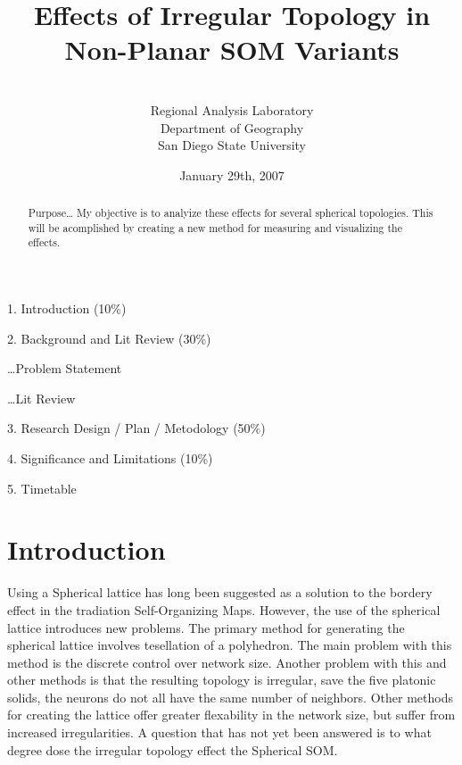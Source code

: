 \documentclass[12pt]{article}
\title{Effects of Irregular Topology in Non-Planar SOM Variants}
\author{\sc{Charles R. Schmidt}\\Regional Analysis Laboratory\\Department of Geography\\San Diego State University}
\date{January 29th, 2007}
\begin{document}
\maketitle
\begin{abstract}

Purpose\ldots
My objective is to analyize these effects for several spherical topologies.
This will be acomplished by creating a new method for measuring and visualizing
the effects.




\end{abstract}



1. Introduction (10\%)

2. Background and Lit Review (30\%)

	\ldots Problem Statement

	\ldots Lit Review

3. Research Design / Plan / Metodology (50\%)

4. Significance and Limitations (10\%)

5. Timetable

\section{Introduction}
Using a Spherical lattice has long been suggested as a solution to the bordery
effect in the tradiation Self-Organizing Maps.  However, the use of the spherical
lattice introduces new problems. The primary method for generating the spherical
lattice involves tesellation of a polyhedron.  The main problem with this method
is the discrete control over network size.  Another problem with this and other
methods is that the resulting topology is irregular, save the five platonic
solids, the neurons do not all have the same number of neighbors.  Other methods
for creating the lattice offer greater flexability in the network size, but
suffer from increased irregularities. A question that has not yet been answered
is to what degree dose the irregular topology effect the Spherical SOM.
\end{document}
